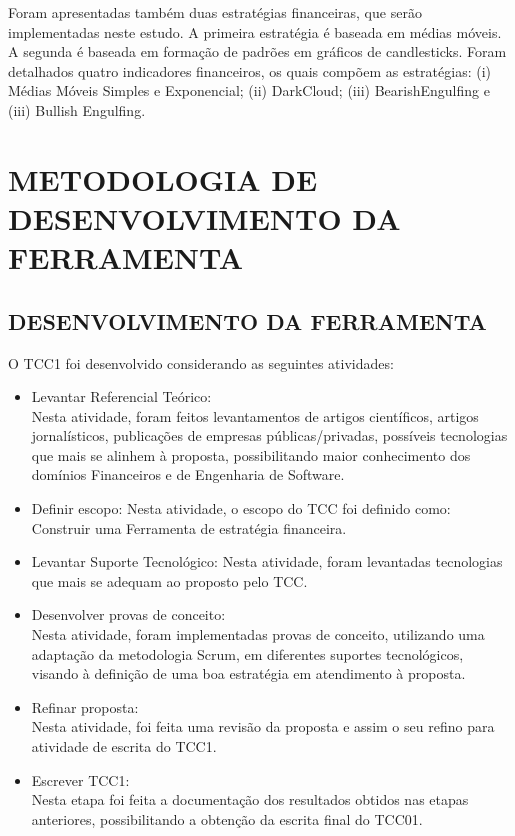 Foram apresentadas também duas estratégias financeiras, que serão implementadas neste estudo. A primeira estratégia é baseada em médias móveis. A segunda é baseada em formação de padrões em gráficos de candlesticks. Foram detalhados quatro indicadores financeiros, os quais compõem as estratégias: (i) Médias Móveis Simples e Exponencial; (ii) DarkCloud; (iii) BearishEngulfing e (iii) Bullish Engulfing.

\chapter[METODOLOGIA DE DESENVOLVIMENTO DA FERRAMENTA]{METODOLOGIA DE DESENVOLVIMENTO DA FERRAMENTA}
\section{DESENVOLVIMENTO DA FERRAMENTA}

O TCC1 foi desenvolvido considerando as seguintes atividades:
\begin{itemize}
\item Levantar Referencial Teórico:\\ Nesta atividade, foram feitos levantamentos de artigos científicos, artigos jornalísticos, publicações de empresas públicas/privadas, possíveis tecnologias que mais se alinhem à proposta, possibilitando maior conhecimento dos domínios Financeiros e de Engenharia de Software.

\item Definir escopo:  
Nesta atividade, o escopo do TCC foi definido como: Construir uma Ferramenta de estratégia financeira.
\item Levantar Suporte Tecnológico: 
 Nesta atividade, foram levantadas tecnologias que mais se adequam ao proposto pelo TCC.
\item Desenvolver provas de conceito:\\ 
Nesta atividade, foram implementadas provas de conceito, utilizando uma adaptação da metodologia Scrum, em diferentes suportes tecnológicos, visando à definição de uma boa estratégia em atendimento à proposta.
\item Refinar proposta: \\
Nesta atividade, foi feita uma revisão da proposta e assim o seu refino para atividade de escrita do TCC1.
\item Escrever TCC1:\\ 
Nesta etapa foi feita a documentação dos resultados obtidos nas etapas anteriores, possibilitando a obtenção da escrita final do TCC01.
\end{itemize}

